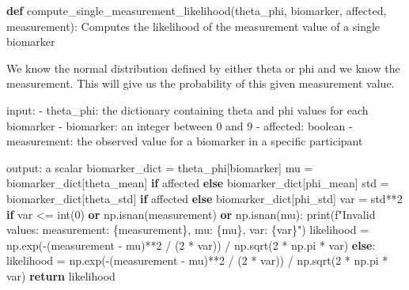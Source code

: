 \documentclass[
  letterpaper,
  DIV=11,
  numbers=noendperiod]{scrreprt}
\newenvironment{Shaded}{\begin{snugshade}}{\end{snugshade}}
\newcommand{\BuiltInTok}[1]{\textcolor[rgb]{0.00,0.23,0.31}{#1}}
\newcommand{\CommentTok}[1]{\textcolor[rgb]{0.37,0.37,0.37}{#1}}
\newcommand{\ControlFlowTok}[1]{\textcolor[rgb]{0.00,0.23,0.31}{\textbf{#1}}}
\newcommand{\DecValTok}[1]{\textcolor[rgb]{0.68,0.00,0.00}{#1}}
\newcommand{\KeywordTok}[1]{\textcolor[rgb]{0.00,0.23,0.31}{\textbf{#1}}}
\newcommand{\NormalTok}[1]{\textcolor[rgb]{0.00,0.23,0.31}{#1}}
\newcommand{\OperatorTok}[1]{\textcolor[rgb]{0.37,0.37,0.37}{#1}}
\newcommand{\SpecialCharTok}[1]{\textcolor[rgb]{0.37,0.37,0.37}{#1}}
\newcommand{\SpecialStringTok}[1]{\textcolor[rgb]{0.13,0.47,0.30}{#1}}
\newcommand{\StringTok}[1]{\textcolor[rgb]{0.13,0.47,0.30}{#1}}
\begin{document}
\begin{Shaded}
\begin{Highlighting}[]
\KeywordTok{def}\NormalTok{ compute\_single\_measurement\_likelihood(theta\_phi, biomarker, affected, measurement):}
    \CommentTok{\textquotesingle{}\textquotesingle{}\textquotesingle{}Computes the likelihood of the measurement value of a single biomarker}

\CommentTok{    We know the normal distribution defined by either theta or phi}
\CommentTok{    and we know the measurement. This will give us the probability}
\CommentTok{    of this given measurement value. }

\CommentTok{    input:}
\CommentTok{    {-} theta\_phi: the dictionary containing theta and phi values for each biomarker}
\CommentTok{    {-} biomarker: an integer between 0 and 9 }
\CommentTok{    {-} affected: boolean }
\CommentTok{    {-} measurement: the observed value for a biomarker in a specific participant}

\CommentTok{    output: a scalar}
\CommentTok{    \textquotesingle{}\textquotesingle{}\textquotesingle{}}
\NormalTok{    biomarker\_dict }\OperatorTok{=}\NormalTok{ theta\_phi[biomarker]}
\NormalTok{    mu }\OperatorTok{=}\NormalTok{ biomarker\_dict[}\StringTok{\textquotesingle{}theta\_mean\textquotesingle{}}\NormalTok{] }\ControlFlowTok{if}\NormalTok{ affected }\ControlFlowTok{else}\NormalTok{ biomarker\_dict[}\StringTok{\textquotesingle{}phi\_mean\textquotesingle{}}\NormalTok{]}
\NormalTok{    std }\OperatorTok{=}\NormalTok{ biomarker\_dict[}\StringTok{\textquotesingle{}theta\_std\textquotesingle{}}\NormalTok{] }\ControlFlowTok{if}\NormalTok{ affected }\ControlFlowTok{else}\NormalTok{ biomarker\_dict[}\StringTok{\textquotesingle{}phi\_std\textquotesingle{}}\NormalTok{]}
\NormalTok{    var }\OperatorTok{=}\NormalTok{ std}\OperatorTok{**}\DecValTok{2}
    \ControlFlowTok{if}\NormalTok{ var }\OperatorTok{\textless{}=} \BuiltInTok{int}\NormalTok{(}\DecValTok{0}\NormalTok{) }\KeywordTok{or}\NormalTok{ np.isnan(measurement) }\KeywordTok{or}\NormalTok{ np.isnan(mu):}
        \BuiltInTok{print}\NormalTok{(}\SpecialStringTok{f"Invalid values: measurement: }\SpecialCharTok{\{}\NormalTok{measurement}\SpecialCharTok{\}}\SpecialStringTok{, mu: }\SpecialCharTok{\{}\NormalTok{mu}\SpecialCharTok{\}}\SpecialStringTok{, var: }\SpecialCharTok{\{}\NormalTok{var}\SpecialCharTok{\}}\SpecialStringTok{"}\NormalTok{)}
\NormalTok{        likelihood }\OperatorTok{=}\NormalTok{ np.exp(}\OperatorTok{{-}}\NormalTok{(measurement }\OperatorTok{{-}}\NormalTok{ mu)}\OperatorTok{**}\DecValTok{2} \OperatorTok{/}
\NormalTok{                            (}\DecValTok{2} \OperatorTok{*}\NormalTok{ var)) }\OperatorTok{/}\NormalTok{ np.sqrt(}\DecValTok{2} \OperatorTok{*}\NormalTok{ np.pi }\OperatorTok{*}\NormalTok{ var)}
    \ControlFlowTok{else}\NormalTok{:}
\NormalTok{        likelihood }\OperatorTok{=}\NormalTok{ np.exp(}\OperatorTok{{-}}\NormalTok{(measurement }\OperatorTok{{-}}\NormalTok{ mu)}\OperatorTok{**}\DecValTok{2} \OperatorTok{/}
\NormalTok{                            (}\DecValTok{2} \OperatorTok{*}\NormalTok{ var)) }\OperatorTok{/}\NormalTok{ np.sqrt(}\DecValTok{2} \OperatorTok{*}\NormalTok{ np.pi }\OperatorTok{*}\NormalTok{ var)}
    \ControlFlowTok{return}\NormalTok{ likelihood}


\end{Highlighting}
\end{Shaded}
\end{document}
